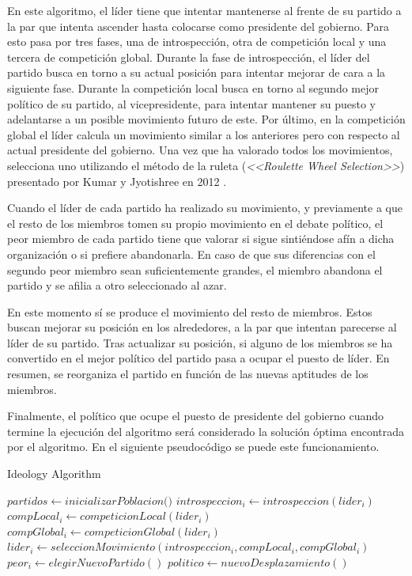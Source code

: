 En este algoritmo, el líder tiene que intentar mantenerse al frente de su partido a la par que intenta ascender hasta colocarse como presidente del gobierno. Para esto pasa por tres fases, una de introspección, otra de competición local y una tercera de competición global. Durante la fase de introspección, el líder del partido busca en torno a su actual posición para intentar mejorar de cara a la siguiente fase. Durante la competición local busca en torno al segundo mejor político de su partido, al vicepresidente, para intentar mantener su puesto y adelantarse a un posible movimiento futuro de este. Por último, en la competición global el líder calcula un movimiento similar a los anteriores pero con respecto al actual presidente del gobierno. Una vez que ha valorado todos los movimientos, selecciona uno utilizando el método de la ruleta (\textit{<<Roulette Wheel Selection>>}) presentado por Kumar y Jyotishree en 2012 \cite{roulette-wheel-selection}.

Cuando el líder de cada partido ha realizado su movimiento, y previamente a que el resto de los miembros tomen su propio movimiento en el debate político, el peor miembro de cada partido tiene que valorar si sigue sintiéndose afín a dicha organización o si prefiere abandonarla. En caso de que sus diferencias con el segundo peor miembro sean suficientemente grandes, el miembro abandona el partido y se afilia a otro seleccionado al azar.

En este momento sí se produce el movimiento del resto de miembros. Estos buscan mejorar su posición en los alrededores, a la par que intentan parecerse al líder de su partido. Tras actualizar su posición, si alguno de los miembros se ha convertido en el mejor político del partido pasa a ocupar el puesto de líder. En resumen, se reorganiza el partido en función de las nuevas aptitudes de los miembros.

Finalmente, el político que ocupe el puesto de presidente del gobierno cuando termine la ejecución del algoritmo será considerado la solución óptima encontrada por el algoritmo. En el siguiente pseudocódigo se puede este funcionamiento.

\begin{algorithm}
	\caption{Ideology Algorithm}
	\begin{algorithmic}[1]
		\State $partidos \gets \textit{inicializarPoblacion()}$
		\State $introspeccion_i \gets introspeccion(lider_i)$
		\State $compLocal_i \gets competicionLocal(lider_i)$
		\State $compGlobal_i \gets competicionGlobal(lider_i)$
		\State $lider_i \gets seleccionMovimiento(introspeccion_i, compLocal_i, compGlobal_i)$
		\State $peor_i \gets elegirNuevoPartido()$
		\EndIf
		\State $politico \gets nuevoDesplazamiento()$
		\EndFor
		\EndWhile
	\end{algorithmic}
\end{algorithm}

